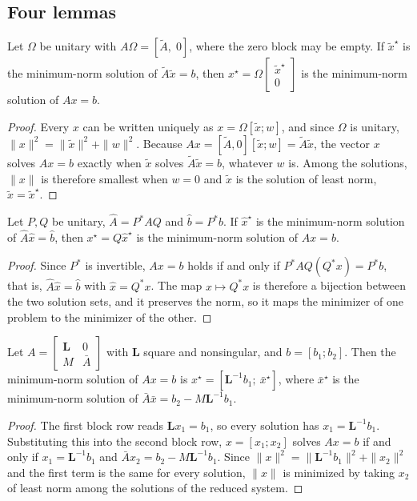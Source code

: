\subsection{Four lemmas}

\begin{lemma}\label{lem:orthogonal}
Let $\Omega$ be unitary with $A\Omega=[\tilde A,\;0]$, where the zero block may be empty. If $\tilde x^\star$
is the minimum-norm solution of $\tilde A\tilde x=b$, then $x^\star=\Omega\begin{bmatrix}\tilde x^\star\\0\end{bmatrix}$
is the minimum-norm solution of $Ax=b$.
\end{lemma}
\begin{proof}
Every $x$ can be written uniquely as $x=\Omega[\tilde x;w]$, and since $\Omega$ is unitary,
$\|x\|^2=\|\tilde x\|^2+\|w\|^2$. Because $Ax=[\tilde A,0][\tilde x;w]=\tilde A\tilde x$, the vector $x$ solves
$Ax=b$ exactly when $\tilde x$ solves $\tilde A\tilde x=b$, whatever $w$ is. Among the solutions, $\|x\|$ is
therefore smallest when $w=0$ and $\tilde x$ is the solution of least norm, $\tilde x=\tilde x^\star$.
\end{proof}

\begin{lemma}\label{lem:twosided}
Let $P,Q$ be unitary, $\hat A=P^*AQ$ and $\hat b=P^*b$. If $\hat x^\star$ is the minimum-norm solution of
$\hat A\hat x=\hat b$, then $x^\star=Q\hat x^\star$ is the minimum-norm solution of $Ax=b$.
\end{lemma}
\begin{proof}
Since $P^*$ is invertible, $Ax=b$ holds if and only if $P^*AQ(Q^*x)=P^*b$, that is,
$\hat A\hat x=\hat b$ with $\hat x=Q^*x$. The map $x\mapsto Q^*x$ is therefore a bijection between the
two solution sets, and it preserves the norm, so it maps the minimizer of one problem to the minimizer
of the other.
\end{proof}

\begin{lemma}\label{lem:forced}
Let $A=\begin{bmatrix}\mathbf L&0\\ M&\bar A\end{bmatrix}$ with $\mathbf L$ square and nonsingular, and
$b=[b_1;b_2]$. Then the minimum-norm solution of $Ax=b$ is
$x^\star=[\mathbf L^{-1}b_1;\ \bar x^\star]$, where $\bar x^\star$ is the minimum-norm solution of
$\bar A\bar x=b_2-M\mathbf L^{-1}b_1$.
\end{lemma}
\begin{proof}
The first block row reads $\mathbf Lx_1=b_1$, so every solution has $x_1=\mathbf L^{-1}b_1$. Substituting this
into the second block row, $x=[x_1;x_2]$ solves $Ax=b$ if and only if $x_1=\mathbf L^{-1}b_1$ and
$\bar Ax_2=b_2-M\mathbf L^{-1}b_1$. Since $\|x\|^2=\|\mathbf L^{-1}b_1\|^2+\|x_2\|^2$ and the first term is
the same for every solution, $\|x\|$ is minimized by taking $x_2$ of least norm among the solutions of
the reduced system.
\end{proof}

